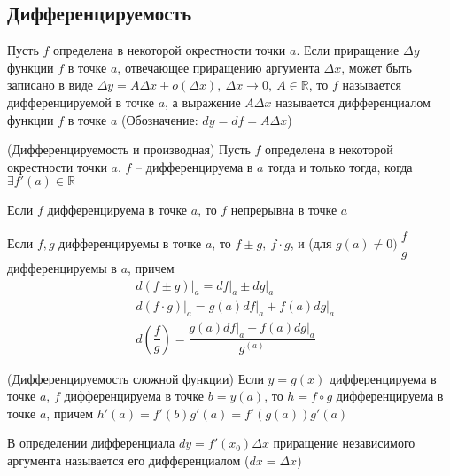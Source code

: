 \begin{multicols}{2}
    \subsection*{Дифференцируемость}
    \begin{definition}{}{} Пусть $f$ определена в некоторой окрестности точки $a$. Если приращение $\Delta y$ функции $f$ в точке $a$, отвечающее приращению аргумента $\Delta x$, может быть записано в виде $\Delta y = A\Delta x + o(\Delta x),\ \Delta x \to 0,\ A\in\mathbb R$, то $f$ называется дифференцируемой в точке $a$, а выражение $A\Delta x$ называется дифференциалом функции $f$ в точке $a$ (Обозначение: $dy = df = A\Delta x$)
    \end{definition}
    \begin{theorema}{(Дифференцируемость и производная)}{} 
            Пусть $f$ определена в некоторой окрестности точки $a$. $f$ -- дифференцируема в $a$ тогда и только тогда, когда $\exists f'(a) \in\mathbb R$
    \end{theorema}
    \begin{proposition}{}{}
        \begin{enumerate*}
            \item Если $f$ дифференцируема в точке $a$, то $f$ непрерывна в точке $a$
            \item Если $f,g$ дифференцируемы в точке $a$, то $f\pm g,\ f\cdot g$, и (для $g(a) \neq 0)\ \dfrac{f}{g}$ дифференцируемы в $a$, причем \begin{align*}
                &d(f\pm g)\big|_a = df\big|_a \pm dg\big|_a\\
                &d(f\cdot g)\big|_a = g(a)df\big|_a + f(a)dg\big|_a\\
                &d(\dfrac{f}{g}) = \dfrac{g(a)df\big|_a - f(a)dg\big|_a}{g^(a)}
            \end{align*}
        \end{enumerate*} 
    \end{proposition}
    \begin{theorema}{(Дифференцируемость сложной функции)}{}
         Если $y = g(x)$ дифференцируема в точке $a$, $f$ дифференцируема в точке $b = y(a)$, то $h = f \circ g$ дифференцируема в точке $a$, причем $h'(a) = f'(b)g'(a) = f'(g(a))g'(a)$
    \end{theorema}
    \begin{definition}{}{} 
        В определении дифференциала $dy = f'(x_0)\Delta x$ приращение независимого аргумента называется его дифференциалом ($dx = \Delta x$)
    \end{definition}

\end{multicols}
